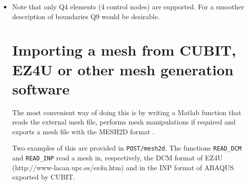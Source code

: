 \begin{itemize}
\item Note that only Q4 elements (4 control nodes) are supported. For a smoother
description of boundaries Q9 would be desirable.

\section{Importing a mesh from CUBIT, EZ4U or other mesh generation software}

The most convenient way of doing this is by writing 
a Matlab function that reads the external mesh file,
performs mesh manipulations if required
and exports a mesh file with the MESH2D format .

Two examples of this are provided in \texttt{POST/mesh2d}.
The functions \texttt{READ\_DCM} and \texttt{READ\_INP}		
read a mesh in, respectively, the DCM format of EZ4U (http://www-lacan.upc.es/ez4u.htm)
and in the INP format of ABAQUS exported by CUBIT.

\end{itemize}

